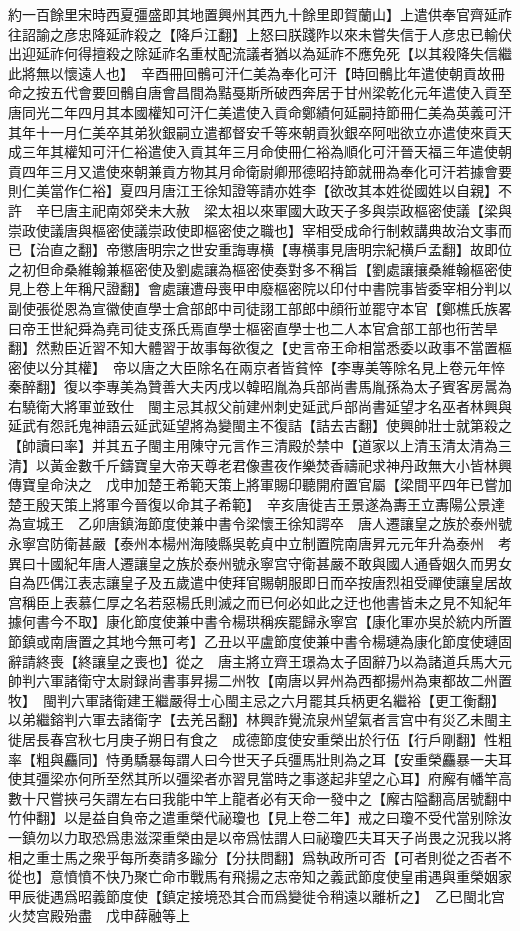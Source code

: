 約一百餘里宋時西夏彊盛即其地置興州其西九十餘里即賀蘭山】上遣供奉官齊延祚往詔諭之彦忠降延祚殺之【降戶江翻】上怒曰朕踐阼以來未嘗失信于人彦忠已輸伏出迎延祚何得擅殺之除延祚名重杖配流議者猶以為延祚不應免死【以其殺降失信繼此將無以懷遠人也】　辛酉冊回鶻可汗仁美為奉化可汗【時回鶻比年遣使朝貢故冊命之按五代會要回鶻自唐會昌間為黠戞斯所破西奔居于甘州梁乾化元年遣使入貢至唐同光二年四月其本國權知可汗仁美遣使入貢命鄭績何延嗣持節冊仁美為英義可汗其年十一月仁美卒其弟狄銀嗣立遣都督安千等來朝貢狄銀卒阿咄欲立亦遣使來貢天成三年其權知可汗仁裕遣使入貢其年三月命使冊仁裕為順化可汗晉天福三年遣使朝貢四年三月又遣使來朝兼貢方物其月命衛尉卿邢德昭持節就冊為奉化可汗若據會要則仁美當作仁裕】夏四月唐江王徐知證等請亦姓李【欲改其本姓從國姓以自親】不許　辛巳唐主祀南郊癸未大赦　梁太祖以來軍國大政天子多與崇政樞密使議【梁與崇政使議唐與樞密使議崇政使即樞密使之職也】宰相受成命行制敕講典故治文事而已【治直之翻】帝懲唐明宗之世安重誨專横【專横事見唐明宗紀横戶孟翻】故即位之初但命桑維翰兼樞密使及劉處讓為樞密使奏對多不稱旨【劉處讓攘桑維翰樞密使見上卷上年稱尺證翻】會處讓遭母喪甲申廢樞密院以印付中書院事皆委宰相分判以副使張從恩為宣徽使直學士倉部郎中司徒詡工部郎中顔衎並罷守本官【鄭樵氏族畧曰帝王世紀舜為堯司徒支孫氏焉直學士樞密直學士也二人本官倉部工部也衎苦旱翻】然勲臣近習不知大體習于故事每欲復之【史言帝王命相當悉委以政事不當置樞密使以分其權】　帝以唐之大臣除名在兩京者皆貧悴【李專美等除名見上卷元年悴秦醉翻】復以李專美為贊善大夫丙戌以韓昭胤為兵部尚書馬胤孫為太子賓客房暠為右驍衛大將軍並致仕　閩主忌其叔父前建州刺史延武戶部尚書延望才名巫者林興與延武有怨託鬼神語云延武延望將為變閩主不復詰【詰去吉翻】使興帥壯士就第殺之【帥讀曰率】并其五子閩主用陳守元言作三清殿於禁中【道家以上清玉清太清為三清】以黃金數千斤鑄寶皇大帝天尊老君像晝夜作樂焚香禱祀求神丹政無大小皆林興傳寶皇命決之　戊申加楚王希範天策上將軍賜印聽開府置官屬【梁間平四年已嘗加楚王殷天策上將軍今晉復以命其子希範】　辛亥唐徙吉王景遂為夀王立夀陽公景達為宣城王　乙卯唐鎮海節度使兼中書令梁懷王徐知諤卒　唐人遷讓皇之族於泰州號永寧宫防衛甚嚴【泰州本楊州海陵縣吳乾貞中立制置院南唐昇元元年升為泰州　考異曰十國紀年唐人遷讓皇之族於泰州號永寧宫守衛甚嚴不敢與國人通昏姻久而男女自為匹偶江表志讓皇子及五歲遣中使拜官賜朝服即日而卒按唐烈祖受禪使讓皇居故宫稱臣上表慕仁厚之名若惡楊氏則滅之而已何必如此之迂也他書皆未之見不知紀年據何書今不取】康化節度使兼中書令楊珙稱疾罷歸永寧宫【康化軍亦吳於統内所置節鎮或南唐置之其地今無可考】乙丑以平盧節度使兼中書令楊璉為康化節度使璉固辭請終喪【終讓皇之喪也】從之　唐主將立齊王璟為太子固辭乃以為諸道兵馬大元帥判六軍諸衛守太尉録尚書事昇揚二州牧【南唐以昇州為西都揚州為東都故二州置牧】　閩判六軍諸衛建王繼嚴得士心閩主忌之六月罷其兵柄更名繼裕【更工衡翻】以弟繼鎔判六軍去諸衛字【去羌呂翻】林興詐覺流泉州望氣者言宫中有災乙未閩主徙居長春宫秋七月庚子朔日有食之　成德節度使安重榮出於行伍【行戶剛翻】性粗率【粗與麤同】恃勇驕暴每謂人曰今世天子兵彊馬壯則為之耳【安重榮麤暴一夫耳使其彊梁亦何所至然其所以彊梁者亦習見當時之事遂起非望之心耳】府廨有幡竿高數十尺嘗挾弓矢謂左右曰我能中竿上龍者必有天命一發中之【廨古隘翻高居號翻中竹仲翻】以是益自負帝之遣重榮代祕瓊也【見上卷二年】戒之曰瓊不受代當别除汝一鎮勿以力取恐爲患滋深重榮由是以帝爲怯謂人曰祕瓊匹夫耳天子尚畏之況我以將相之重士馬之衆乎每所奏請多踰分【分扶問翻】爲執政所可否【可者則從之否者不從也】意憤憤不快乃聚亡命市戰馬有飛揚之志帝知之義武節度使皇甫遇與重榮姻家甲辰徙遇爲昭義節度使【鎮定接境恐其合而爲變徙令稍遠以離析之】　乙巳閩北宫火焚宫殿殆盡　戊申薛融等上
